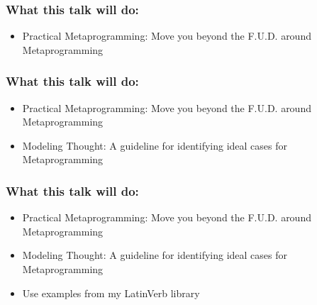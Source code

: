 \documentclass[slidestop,compress,mathserif,notes]{beamer}
\begin{document}
\begin{frame}
	\frametitle{What this talk will do:}
	\begin{itemize}
		\item Practical Metaprogramming: Move you beyond the F.U.D. around Metaprogramming
	\end{itemize}
\end{frame}

\begin{frame}
	\frametitle{What this talk will do:}
	\begin{itemize}
		\item Practical Metaprogramming: Move you beyond the F.U.D. around Metaprogramming
		\item Modeling Thought:  A guideline for identifying ideal cases for Metaprogramming
	\end{itemize}
\end{frame}

\begin{frame}
	\frametitle{What this talk will do:}
	\begin{itemize}
		\item Practical Metaprogramming: Move you beyond the F.U.D. around Metaprogramming
		\item Modeling Thought:  A guideline for identifying ideal cases for Metaprogramming
		\item Use examples from my LatinVerb library
	\end{itemize}
\end{frame}

% 	
\end{document}
